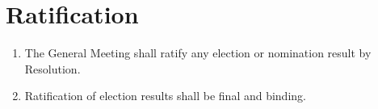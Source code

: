 \section{Ratification}
\label{ratification}

\begin{enumerate}
 \item The General Meeting shall ratify any election or nomination result by Resolution.
 \item Ratification of election results shall be final and binding.
\end{enumerate}
